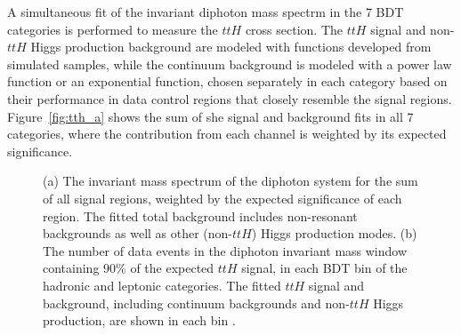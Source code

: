 \documentclass{moriond}
\begin{document}
A simultaneous fit of the invariant diphoton mass spectrm in the 7 BDT categories is performed to
measure the $ttH$ cross section. The $ttH$ signal and non-$ttH$ Higgs production background are
modeled with functions developed from simulated samples, while the continuum background is modeled
with a power law function or an exponential function, chosen separately in each category based on their
performance in data control regions that closely resemble the signal regions.
Figure~\ref{fig:tth_a} shows the sum of she signal and background fits in all 7 categories, where
the contribution from each channel is weighted by its expected significance.

\begin{figure}[!htbp]
  \centering
  \caption{
    (a) The invariant mass spectrum of the diphoton system for the sum of all signal regions, weighted
    by the expected significance of each region. The fitted total background includes non-resonant
    backgrounds as well as other (non-$ttH$) Higgs production modes.
    (b) The number of data events in the diphoton invariant mass window containing 90\% of the expected
    $ttH$ signal, in each BDT bin of the hadronic and leptonic categories.
    The fitted $ttH$ signal and background, including continuum backgrounds and non-$ttH$ Higgs
    production, are shown in each bin \cite{ATLAS-CONF-2019-004}.
  }
  \label{fig:tth}
\end{figure}
\end{document}
